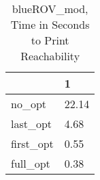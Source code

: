 \begin{table}
\caption{blueROV\_mod, Time in Seconds to Print Reachability}
\label{blueROV_mod_states_time}
\begin{tabular}{ll}
\toprule
 & 1 \\
\midrule
no\_opt & 22.14 \\
last\_opt & 4.68 \\
first\_opt & 0.55 \\
full\_opt & 0.38 \\
\bottomrule
\end{tabular}
\end{table}
